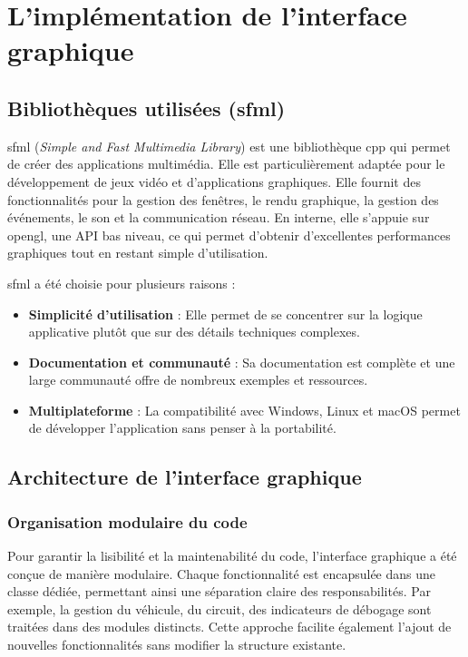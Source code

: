\section{L'implémentation de l'interface graphique}\label{sec:l'implementation-de-l-interface-graphique}
\subsection{Bibliothèques utilisées (\gls{sfml})}\label{subsec:sfml}
\gls{sfml} (\textit{Simple and Fast Multimedia Library}) est une bibliothèque \gls{cpp} qui permet de créer des applications multimédia.
Elle est particulièrement adaptée pour le développement de jeux vidéo et d'applications graphiques.
Elle fournit des fonctionnalités pour la gestion des fenêtres, le rendu graphique, la gestion des événements, le son et la communication réseau.
En interne, elle s'appuie sur \gls{opengl}, une API bas niveau, ce qui permet d'obtenir d'excellentes performances graphiques tout en restant simple d'utilisation.

\gls{sfml} a été choisie pour plusieurs raisons :
\begin{itemize}
    \item \textbf{Simplicité d'utilisation} : Elle permet de se concentrer sur la logique applicative plutôt que sur des détails techniques complexes.
    \item \textbf{Documentation et communauté} : Sa documentation\cite{documentationSFML} est complète et une large communauté offre de nombreux exemples et ressources.
    \item \textbf{Multiplateforme} : La compatibilité avec Windows, Linux et macOS permet de développer l'application sans penser à la portabilité.
\end{itemize}

\subsection{Architecture de l'interface graphique}\label{subsec:architecture-de-l-interface-graphique}
\subsubsection{Organisation modulaire du code}\label{subsubsec:organisation-modulaire-du-code}
Pour garantir la lisibilité et la maintenabilité du code, l'interface graphique a été conçue de manière modulaire.
Chaque fonctionnalité est encapsulée dans une classe dédiée, permettant ainsi une séparation claire des responsabilités.
Par exemple, la gestion du véhicule, du circuit, des indicateurs de débogage sont traitées dans des modules distincts.
Cette approche facilite également l'ajout de nouvelles fonctionnalités sans modifier la structure existante.

